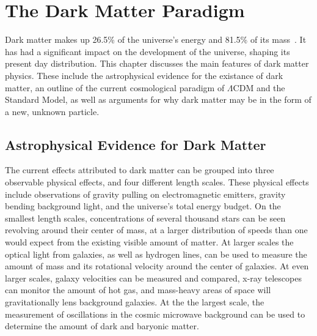 \cleartooddpage[\thispagestyle{empty}]
\chapter{The Dark Matter Paradigm}\label{ch_dm}

  Dark matter makes up 26.5\% of the universe's energy and 81.5\% of its mass~\cite{planck2015}.
  It has had a significant impact on the development of the universe, shaping its present day distribution.
  This chapter discusses the main features of dark matter physics.
  These include the astrophysical evidence for the existance of dark matter, an outline of the current cosmological paradigm of $\Lambda$CDM and the Standard Model, as well as arguments for why dark matter may be in the form of a new, unknown particle.


\section{Astrophysical Evidence for Dark Matter}
  
  The current effects attributed to dark matter can be grouped into three observable physical effects, and four different length scales.
  These physical effects include observations of gravity pulling on electromagnetic emitters, gravity bending background light, and the universe's total energy budget.
  On the smallest length scales, concentrations of several thousand stars can be seen revolving around their center of mass, at a larger distribution of speeds than one would expect from the existing visible amount of matter.
  At larger scales the optical light from galaxies, as well as hydrogen lines, can be used to measure the amount of mass and its rotational velocity around the center of galaxies.
  At even larger scales, galaxy velocities can be measured and compared, x-ray telescopes can monitor the amount of hot gas, and mass-heavy areas of space will gravitationally lens background galaxies.
  At the the largest scale, the measurement of oscillations in the cosmic microwave background can be used to determine the amount of dark and baryonic matter.
  
